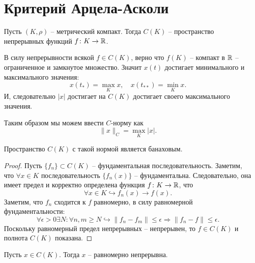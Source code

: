 \section{Критерий Арцела-Асколи}
\begin{definition}
    Пусть $(K, \rho)$ -- метрический компакт.
    Тогда $C(K)$ -- пространство непрерывных функций $f\colon K \to \mathbb{R}$.
\end{definition}
\begin{note}
    В силу непрерывности всякой $f \in C(K)$, верно что $f(K)$ -- компакт в $\mathbb{R}$ -- ограниченное и замкнутое множество.
    Значит $x(t)$ достигает минимального и максимального значения:
    \[
        x(t_*) = \max_{K} x, \quad x(t_{**}) = \min_{K} x.
    \]
    И, следовательно $|x|$ достигает на $C(K)$ достигает своего максимального значения.

    Таким образом мы можем ввести $C$-норму как
    \[
        \|x\|_C = \max_{K} |x|.
    \]

    Пространство $C(K)$ с такой нормой является банаховым.
    \begin{proof}
        Пусть $\{f_n\} \subset C(K)$ -- фундаментальная последовательность.
        Заметим, что $\forall x \in K$ последовательность $\{f_n(x)\}$ -- фундаментальна.
        Следовательно, она имеет предел и корректно определена функция $f\colon K \to \mathbb{R}$, что
        \[
            \forall x \in K \hookrightarrow f_n(x) \rightarrow f(x).
        \]
        Заметим, что $f_n$ сходится к $f$ равномерно, в силу равномерной фундаментальности:
        \[
            \forall \epsilon > 0 \exists N\colon \forall n,m \geq N \hookrightarrow \|f_n - f_m\| \leq \epsilon \Rightarrow \|f_n - f\| \leq \epsilon.
        \]
        Поскольку равномерный предел непрерывных -- непрерывен, то $f \in C(K)$ и полнота $C(K)$ показана.
    \end{proof}
\end{note}
\begin{theorem}[Кантор]
    Пусть $x \in C(K)$.
    Тогда $x$ -- равномерно непрерывна.
\end{theorem}
